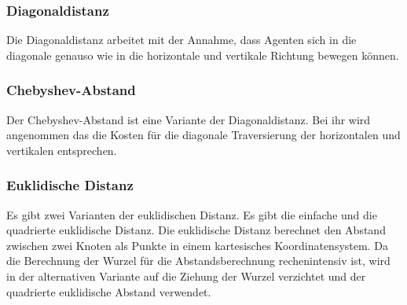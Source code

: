 \subsubsection{Diagonaldistanz}
Die Diagonaldistanz arbeitet mit der Annahme, dass Agenten sich in die diagonale genauso wie in die horizontale und vertikale Richtung bewegen können. 
\subsubsection{Chebyshev-Abstand}
Der Chebyshev-Abstand ist eine Variante der Diagonaldistanz. Bei ihr wird angenommen das die Kosten für die diagonale Traversierung der horizontalen und vertikalen entsprechen. 
\subsubsection{Euklidische Distanz}
Es gibt zwei Varianten der euklidischen Distanz. Es gibt die einfache und die quadrierte euklidische Distanz. Die euklidische Distanz berechnet den Abstand zwischen zwei Knoten als Punkte in einem kartesisches Koordinatensystem. Da die Berechnung der Wurzel für die Abstandsberechnung rechenintensiv ist, wird in der alternativen Variante auf die Ziehung der Wurzel verzichtet und der quadrierte euklidische Abstand verwendet\cite{YouSurLuhu}.


